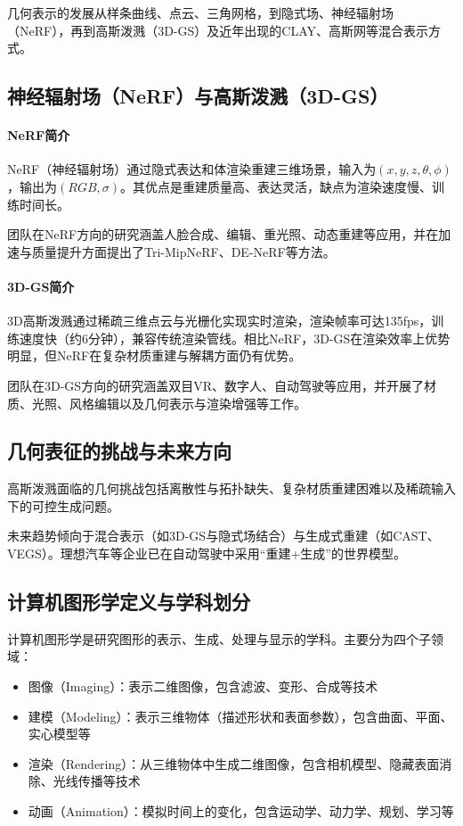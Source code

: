 \documentclass[12pt]{article}
\begin{document}
几何表示的发展从样条曲线、点云、三角网格，到隐式场、神经辐射场（NeRF），再到高斯泼溅（3D-GS）及近年出现的CLAY、高斯网等混合表示方式。

\subsection{神经辐射场（NeRF）与高斯泼溅（3D-GS）}

\paragraph{NeRF简介}
NeRF（神经辐射场）通过隐式表达和体渲染重建三维场景，输入为$(x,y,z,\theta,\phi)$，输出为$(RGB,\sigma)$。其优点是重建质量高、表达灵活，缺点为渲染速度慢、训练时间长。

团队在NeRF方向的研究涵盖人脸合成、编辑、重光照、动态重建等应用，并在加速与质量提升方面提出了Tri-MipNeRF、DE-NeRF等方法。

\paragraph{3D-GS简介}
3D高斯泼溅通过稀疏三维点云与光栅化实现实时渲染，渲染帧率可达135fps，训练速度快（约6分钟），兼容传统渲染管线。相比NeRF，3D-GS在渲染效率上优势明显，但NeRF在复杂材质重建与解耦方面仍有优势。

团队在3D-GS方向的研究涵盖双目VR、数字人、自动驾驶等应用，并开展了材质、光照、风格编辑以及几何表示与渲染增强等工作。

\subsection{几何表征的挑战与未来方向}

高斯泼溅面临的几何挑战包括离散性与拓扑缺失、复杂材质重建困难以及稀疏输入下的可控生成问题。

未来趋势倾向于混合表示（如3D-GS与隐式场结合）与生成式重建（如CAST、VEGS）。理想汽车等企业已在自动驾驶中采用“重建+生成”的世界模型。

\subsection{计算机图形学定义与学科划分}

计算机图形学是研究图形的表示、生成、处理与显示的学科。主要分为四个子领域：

\begin{itemize}
    \item 图像（Imaging）：表示二维图像，包含滤波、变形、合成等技术
    \item 建模（Modeling）：表示三维物体（描述形状和表面参数），包含曲面、平面、实心模型等
    \item 渲染（Rendering）：从三维物体中生成二维图像，包含相机模型、隐藏表面消除、光线传播等技术
    \item 动画（Animation）：模拟时间上的变化，包含运动学、动力学、规划、学习等
\end{itemize}
\end{document}
